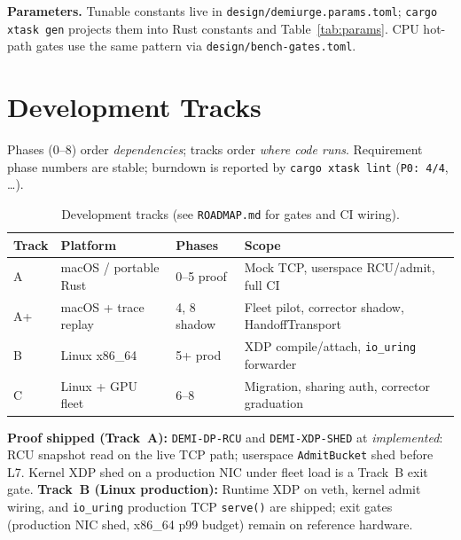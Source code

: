 \documentclass[11pt]{article}
\newcommand{\proof}[1]{\textbf{Proof shipped (Track~A):} #1}
\newcommand{\trackb}[1]{\textbf{Track~B (Linux production):} #1}
\begin{document}
\textbf{Parameters.} Tunable constants live in \texttt{design/demiurge.params.toml};
\texttt{cargo xtask gen} projects them into Rust constants and
Table~\ref{tab:params}. CPU hot-path gates use the same pattern via
\texttt{design/bench-gates.toml}.

\section{Development Tracks}\label{sec:tracks}
Phases (0--8) order \emph{dependencies}; tracks order \emph{where code runs}.
Requirement phase numbers are stable; burndown is reported by
\texttt{cargo xtask lint} (\texttt{P0: 4/4}, \ldots).

\begin{table}[h]
  \centering
  \small
  \begin{tabular}{lllp{6.5cm}}
    \toprule
    Track & Platform & Phases & Scope \\
    \midrule
    A & macOS / portable Rust & 0--5 proof & Mock TCP, userspace RCU/admit, full CI \\
    A+ & macOS + trace replay & 4, 8 shadow & Fleet pilot, corrector shadow, HandoffTransport \\
    B & Linux x86\_64 & 5+ prod & XDP compile/attach, \texttt{io\_uring} forwarder \\
    C & Linux + GPU fleet & 6--8 & Migration, sharing auth, corrector graduation \\
    \bottomrule
  \end{tabular}
  \caption{Development tracks (see \texttt{ROADMAP.md} for gates and CI wiring).}
  \label{tab:tracks}
\end{table}

\proof{\texttt{DEMI-DP-RCU} and \texttt{DEMI-XDP-SHED} at \emph{implemented}: RCU
snapshot read on the live TCP path; userspace \texttt{AdmitBucket} shed before L7.
Kernel XDP shed on a production NIC under fleet load is a Track~B exit gate.}
\trackb{Runtime XDP on veth, kernel admit wiring, and \texttt{io\_uring}
production TCP \texttt{serve()} are shipped; exit gates (production NIC shed,
x86\_64 p99 budget) remain on reference hardware.}
\end{document}
